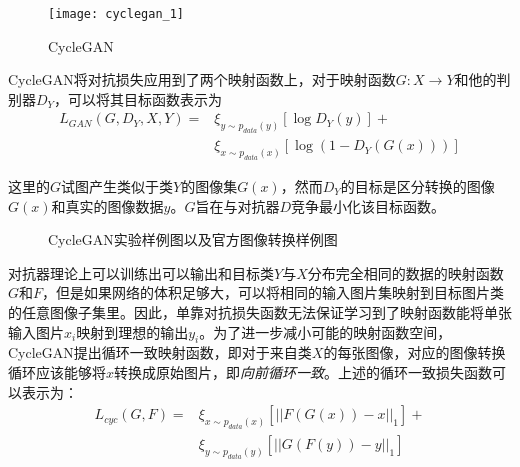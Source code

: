 \begin{figure}[h]
    \centering
    \texttt{[image: cyclegan\_1]}
    \caption{CycleGAN}
    \label{lable-cyclgan} 
\end{figure}

CycleGAN将对抗损失应用到了两个映射函数上，对于映射函数$G:X\to Y$和他的判别器$D_Y$，可以将其目标函数表示为
\begin{equation}
\begin{aligned}
    \label{eq:2}
    L_{GAN}(G,D_Y,X,Y)= & \xi_{y\sim p_{data}(y)}[\log D_Y(y)] + \\
    & \xi_{x\sim p_{data}(x)}[\log (1-D_Y(G(x)))]
\end{aligned}
\end{equation}

这里的$G$试图产生类似于类$Y$的图像集$G(x)$，然而$D_Y$的目标是区分转换的图像$G(x)$和真实的图像数据$y$。$G$旨在与对抗器$D$竞争最小化该目标函数。

\begin{figure}[b]
    \centering
    \caption{CycleGAN实验样例图以及官方图像转换样例图}
    \label{fig:cyclegan}
\end{figure}

对抗器理论上可以训练出可以输出和目标类$Y$与$X$分布完全相同的数据的映射函数$G$和$F$，但是如果网络的体积足够大，可以将相同的输入图片集映射到目标图片类的任意图像子集里。因此，单靠对抗损失函数无法保证学习到了映射函数能将单张输入图片$x_i$映射到理想的输出$y_i$。为了进一步减小可能的映射函数空间，CycleGAN提出循环一致映射函数，即对于来自类$X$的每张图像，对应的图像转换循环应该能够将$x$转换成原始图片，即\textit{向前循环一致}。上述的循环一致损失函数可以表示为：
\begin{equation}
\begin{aligned}
    \label{eq:3}
    L_{cyc}(G,F)= & \xi_{x\sim p_{data}(x)}[||F(G(x))-x||_1] + \\
    & \xi_{y\sim p_{data}(y)}[||G(F(y))-y||_1]
\end{aligned}
\end{equation}

